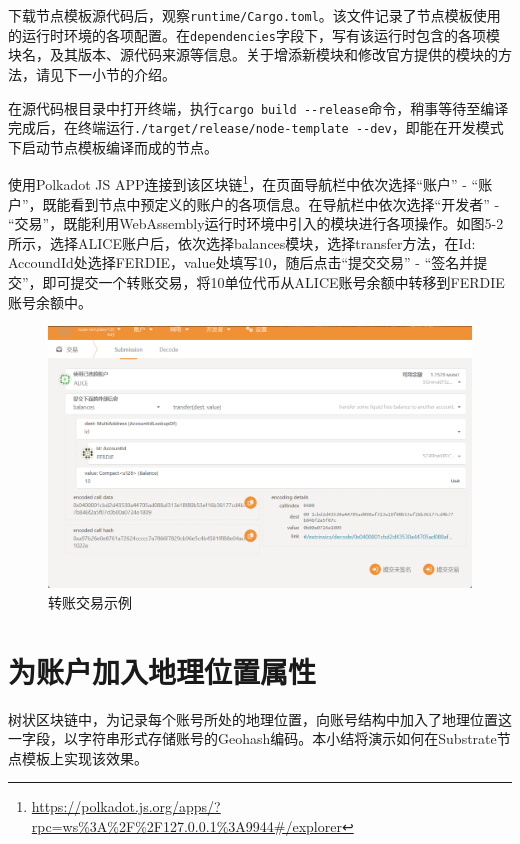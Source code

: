 下载节点模板源代码后，观察\verb|runtime/Cargo.toml|。该文件记录了节点模板使用的运行时环境的各项配置。在\verb|dependencies|字段下，写有该运行时包含的各项模块名，及其版本、源代码来源等信息。关于增添新模块和修改官方提供的模块的方法，请见下一小节的介绍。

在源代码根目录中打开终端，执行\verb|cargo build --release|命令，稍事等待至编译完成后，在终端运行\verb|./target/release/node-template --dev|，即能在开发模式下启动节点模板编译而成的节点。

使用Polkadot JS APP连接到该区块链\footnote{\url{https://polkadot.js.org/apps/?rpc=ws\%3A\%2F\%2F127.0.0.1\%3A9944\#/explorer}}，在页面导航栏中依次选择“账户” - “账户”，既能看到节点中预定义的账户的各项信息。在导航栏中依次选择“开发者” - “交易”，既能利用WebAssembly运行时环境中引入的模块进行各项操作。如图5-2所示，选择ALICE账户后，依次选择balances模块，选择transfer方法，在Id: AccoundId处选择FERDIE，value处填写10，随后点击“提交交易” - “签名并提交”，即可提交一个转账交易，将10单位代币从ALICE账号余额中转移到FERDIE账号余额中。

\begin{figure}[htbp]
    \centering
    \includegraphics[width=\textwidth]{images/substrateTransfer.png}
    \caption{转账交易示例}\label{转账交易示例} %
\end{figure}

\section{为账户加入地理位置属性}

树状区块链中，为记录每个账号所处的地理位置，向账号结构中加入了地理位置这一字段，以字符串形式存储账号的Geohash编码。本小结将演示如何在Substrate节点模板上实现该效果。

